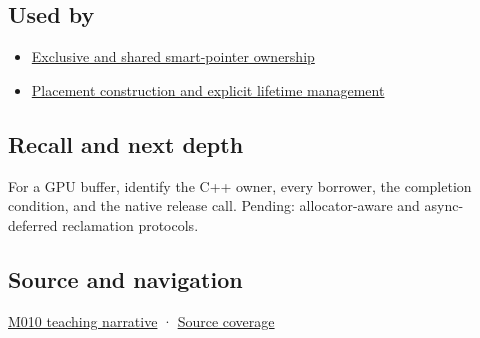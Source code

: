 \subsection{Used by}\label{appendix-69739d3ab49b-used-by}

\hypertarget{appendix-69739d3ab49b-used-by}{}

\begin{itemize}
\tightlist
\item
  \hyperref[appendix-51602cabe815]{Exclusive and shared smart-pointer ownership}
\item
  \hyperref[appendix-f56c3e43fd4e]{Placement construction and explicit lifetime management}
\end{itemize}

\subsection{Recall and next depth}\label{appendix-69739d3ab49b-recall-and-next-depth}

\hypertarget{appendix-69739d3ab49b-recall-and-next-depth}{}

For a GPU buffer, identify the C++ owner, every borrower, the completion condition, and the native release call. Pending: allocator-aware and async-deferred reclamation protocols.

\subsection{Source and navigation}\label{appendix-69739d3ab49b-source-and-navigation}

\hypertarget{appendix-69739d3ab49b-source-and-navigation}{}

\hyperref[01-foundations-i-ch004-from-a-live-object-to-responsible-resource-ownership]{M010 teaching narrative} · \hyperref[appendix-fd090d982a15-m010---parts-148-160]{Source coverage}
